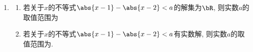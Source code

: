 \begin{enumerate}
\begin{enumerate}
\begin{jieda}
\begin{enumerate}
            \item 方法2 \\
            通过设$x = ka(k \in \mathbf{R})$来简化计算。\\
            根据$x = ka(k \in \mathbf{R})$，不等式可以化为$|ka - 2a| + |2ka - a| \geq a^2$，\\
            消去$|a|$，不等式变为$|k - 2| + |2k - 1| \geq |a|$。\\
            通过对$k$进行分类讨论，可以得到$|k - 2| + |2k - 1|$的取值范围为$[\dfrac{3}{2}, +\infty)$，故$|a| \leq \dfrac{3}{2}$，即$a \in \left[-\dfrac{3}{2}, \dfrac{3}{2}\right]$
            \end{enumerate}
            \ps 斜底锅函数$f(x) = |ax+b|+|cx+d|$（$|a| \neq |c|$），若$|a| > |c|$，则取最小值时$x = -\dfrac{b}{a}$，若$|a| < |c|$，则取最小值时$x = -\dfrac{d}{c}$
        \end{jieda}
    \item 
    \begin{enumerate}
        \item  若关于$x$的不等式$\abs{x-1}-\abs{x-2}<a$的解集为$\bR$, 则实数$a$的取值范围为
        
        \item 若关于$x$的不等式$\abs{x-1}-\abs{x-2}<a$有实数解, 则实数$a$的取值范围为. 
        

\end{enumerate}
\end{enumerate}
\end{enumerate}
